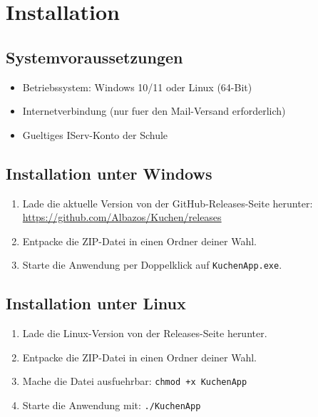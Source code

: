\documentclass[12pt, a4paper]{article}
\begin{document}
\section{Installation}

\subsection{Systemvoraussetzungen}

\begin{itemize}[leftmargin=1.5em]
    \item Betriebssystem: Windows 10/11 oder Linux (64-Bit)
    \item Internetverbindung (nur fuer den Mail-Versand erforderlich)
    \item Gueltiges IServ-Konto der Schule
\end{itemize}

\subsection{Installation unter Windows}

\begin{stepbox}
\begin{enumerate}[leftmargin=1.5em]
    \item Lade die aktuelle Version von der GitHub-Releases-Seite herunter:\\
          \url{https://github.com/Albazos/Kuchen/releases}
    \item Entpacke die ZIP-Datei in einen Ordner deiner Wahl.
    \item Starte die Anwendung per Doppelklick auf \texttt{KuchenApp.exe}.
\end{enumerate}
\end{stepbox}

\subsection{Installation unter Linux}

\begin{stepbox}
\begin{enumerate}[leftmargin=1.5em]
    \item Lade die Linux-Version von der Releases-Seite herunter.
    \item Entpacke die ZIP-Datei in einen Ordner deiner Wahl.
    \item Mache die Datei ausfuehrbar: \texttt{chmod +x KuchenApp}
    \item Starte die Anwendung mit: \texttt{./KuchenApp}
\end{enumerate}
\end{stepbox}
\end{document}
